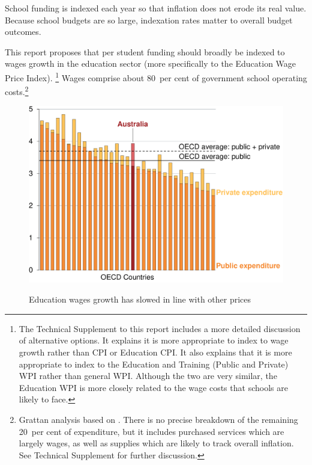 \documentclass{grattan}
\begin{document}
School funding is indexed each year so that inflation does not erode its real value.
Because school budgets are so large, indexation rates matter to overall budget outcomes.

This report proposes that per student funding should broadly be indexed to wages growth in the education sector (more specifically to the Education Wage Price Index).%
\footnote{The Technical Supplement to this report includes a more detailed discussion of alternative options. It explains it is more appropriate to index to wage growth rather than CPI or Education CPI\@.
It also explains that it is more appropriate to index to the Education and Training (Public and Private) WPI rather than general WPI\@.
Although the two are very similar, the Education WPI is more closely related to the wage costs that schools are likely to face.}
Wages comprise about 80~per cent of government school operating costs.\footnote{Grattan analysis based on \textcite{Commission2016ReportGovernmentServices}.
There is no precise breakdown of the remaining 20~per cent of expenditure, but it includes purchased services which are largely wages, as well as supplies which are likely to track overall inflation.
See Technical Supplement for further discussion.}

\begin{figure}
\caption{Education wages growth has slowed in line with other prices}\label{fig:edu-wages-have-slowed-over-past-few-years-as-inflation-has-come-down}
\includegraphics[page=10]{atlas/Charts.pdf}
{\textcites{ABS2016ConsumerPriceIndex}{ABS2016WagePriceIndex}}%
\end{figure}
\end{document}
